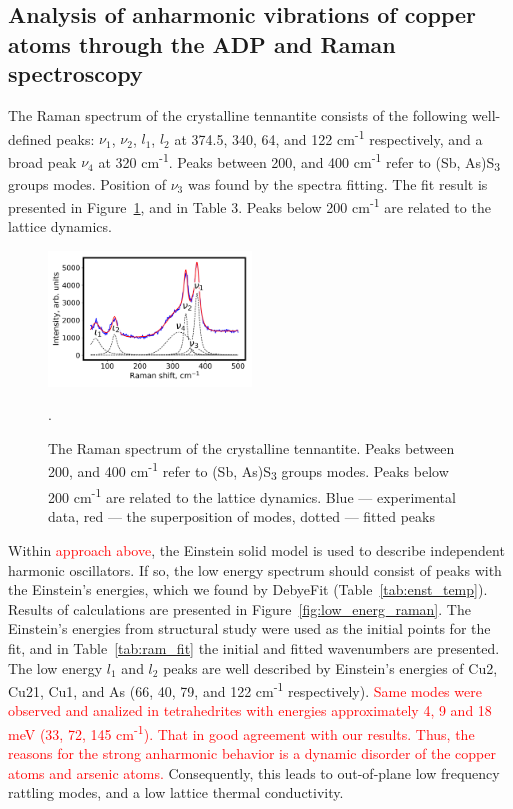 \documentclass[preprint,review,12pt]{elsarticle}
\begin{document}
\subsection{Analysis of anharmonic vibrations of copper atoms through the ADP and Raman spectroscopy}\label{sec:level2}

The Raman spectrum of the crystalline tennantite consists of the following well-defined peaks: $\nu_{1}$, $\nu_{2}$, $l_{1}$, $l_{2}$ at 374.5, 340, 64, and 122 cm\textsuperscript{-1} respectively, and a broad peak $\nu_{4}$ at 320 cm\textsuperscript{-1}. Peaks between 200, and 400 cm\textsuperscript{-1} refer to (Sb, As)S\textsubscript{3} groups modes\cite{Kharbish2007}.
Position of $\nu_{3}$ was found by the spectra fitting.
The fit result is presented in Figure~\ref{fig:full_raman}, and in Table 3. Peaks below 200 cm\textsuperscript{-1} are related to the lattice dynamics\cite{Buzatu2017}.

\begin{figure}[h]
\centering
\includegraphics[width=0.48\textwidth]{raman_25_CuAsS3_eng_components}
\caption{\label{fig:full_raman} The Raman spectrum of the crystalline tennantite. Peaks between 200, and 400 cm\textsuperscript{-1} refer to (Sb, As)S\textsubscript{3} groups modes\cite{Kharbish2007}. Peaks below 200 cm\textsuperscript{-1} are related to the lattice dynamics\cite{Buzatu2017}. Blue --- experimental data, red --- the superposition of modes, dotted --- fitted peaks}.
\end{figure}

Within \textcolor{red}{approach above}, the Einstein solid model is used to describe independent harmonic oscillators.
If so, the low energy spectrum should consist of peaks with the Einstein's energies, which we found by DebyeFit (Table~\ref{tab:enst_temp}).
Results of calculations are presented in Figure~\ref{fig:low_energ_raman}.
The Einstein's energies from structural study were used as the initial points for the fit, and in Table~\ref{tab:ram_fit} the initial  and fitted wavenumbers are presented.
The low energy $l_{1}$ and $l_{2}$ peaks are well described by Einstein's energies of Cu2, Cu21, Cu1, and As (66, 40, 79, and 122 cm\textsuperscript{-1} respectively).
\textcolor{red}{Same modes were observed and analized in tetrahedrites\cite{May2016,Lai2015} with energies approximately 4, 9 and 18 meV (33, 72, 145 cm\textsuperscript{-1}).
That in good agreement with our results.
Thus, the reasons for the strong anharmonic behavior is a dynamic disorder of the copper atoms and arsenic atoms.}
Consequently, this leads to out-of-plane low frequency rattling modes, and a low lattice thermal conductivity.
\end{document}
